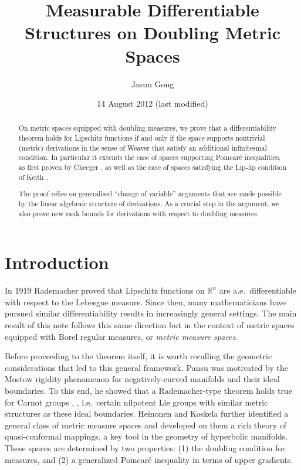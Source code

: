 \documentclass[reqno]{amsart}
\title{Measurable Differentiable Structures on Doubling Metric Spaces}
\date{14 August 2012 (last modified)}
\author{Jasun Gong}
\theoremstyle{plain}
\theoremstyle{definition}
\theoremstyle{remark}
\numberwithin{equation}{section}
\newcommand{\R}{\mathbb{R}}
\begin{document}
\maketitle

\begin{abstract}
On metric spaces equipped with doubling measures, we prove that a differentiability theorem holds for Lipschitz functions if and only if the space supports nontrivial (metric) derivations in the sense of Weaver \cite{WeaverED} that satisfy an additional infinitesmal condition.  In particular it extends the case of spaces supporting Poincar\'e inequalities, as first proven by Cheeger \cite{Cheeger}, as well as the case of spaces satisfying the Lip-lip condition of Keith \cite{Keith}.

The proof relies on generalised ``change of variable'' arguments that are made possible by the linear algebraic structure of derivations.  As a crucial step in the argument, we also prove new rank bounds for derivations with respect to doubling measures.

\end{abstract}

\section{Introduction}

In 1919 Rademacher %
proved that Lipschitz functions on $\R^n$ are a.e.\ differentiable with respect to the Lebesgue measure.  Since then, many mathematicians have pursued similar differentiability results in increasingly general settings.  The main result of this note follows this same direction but in the context of metric spaces equipped with Borel regular measures, or {\em metric measure spaces}.

Before proceeding to the theorem itself, it is worth recalling the geometric considerations that led to this general framework.  Pansu \cite{Pansu} was motivated by the Mostow rigidity phenomenon for negatively-curved manifolds and their ideal boundaries.  To this end, he showed that a Rademacher-type theorem holds true for Carnot groups \cite{Gromov:CC}, \cite{Bellaiche}, i.e.\ certain nilpotent Lie groups with similar metric structures as these ideal boundaries.
Heinonen and Koskela  \cite{Heinonen:Koskela} further identified a general class of metric measure spaces and developed on them a rich theory of quasi-conformal mappings, a key tool in the geometry of hyperbolic manifolds.  These spaces are determined by two properties: (1) the doubling condition for measures, and (2) a generalized Poincar\'e inequality in terms of upper gradients.
\end{document}
